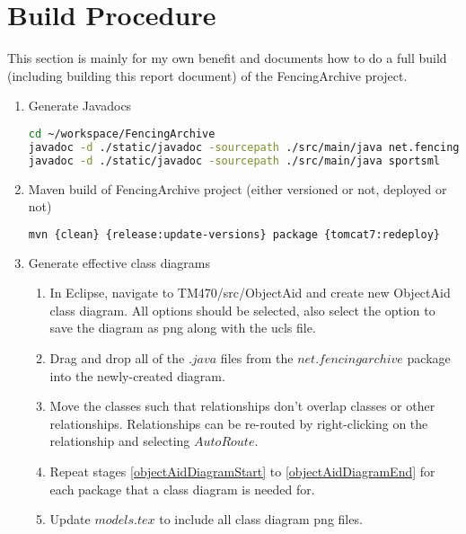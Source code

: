 \chapter{Build Procedure} \label{appendixBuildProcedure}

This section is mainly for my own benefit and documents how to do a full build
(including building this report document) of the FencingArchive project.
\begin{enumerate}
  \item Generate Javadocs
\begin{lstlisting}[language=bash, caption={Javadoc Generation}]
cd ~/workspace/FencingArchive
javadoc -d ./static/javadoc -sourcepath ./src/main/java net.fencingarchive
javadoc -d ./static/javadoc -sourcepath ./src/main/java sportsml
\end{lstlisting}
  \item Maven build of FencingArchive project (either versioned or not, deployed
  or not)
\begin{lstlisting}[language=bash, caption={Maven Build}]
mvn {clean} {release:update-versions} package {tomcat7:redeploy}
\end{lstlisting}
  \item Generate effective class diagrams
  \begin{enumerate}
    \item \label{objectAidDiagramStart} In Eclipse, navigate to
    TM470/src/ObjectAid and create new ObjectAid class diagram. All options should be selected, also select the option to save the diagram as png along with the ucls file.
    \item Drag and drop all of the \(.java\) files from the
    \(net.fencingarchive\) package into the newly-created diagram.
    \item \label{objectAidDiagramEnd} Move the classes such that relationships
    don't overlap classes or other relationships. Relationships can be re-routed by right-clicking on the
    relationship and selecting \(Auto Route\).
    \item Repeat stages \ref{objectAidDiagramStart} to
    \ref{objectAidDiagramEnd} for each package that a class diagram is needed
    for.
    \item Update \(models.tex\) to include all class diagram png files.
  \end{enumerate}

\end{enumerate}
